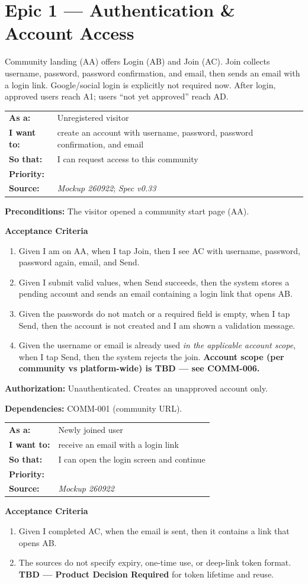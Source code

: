 \documentclass[11pt,a4paper]{article}
\makeatletter
\newcommand{\priPzero}{\colorbox{p0}{\makebox[4.6em]{\textcolor{white}{\scriptsize\bfseries P0 V1}}}}
\newcommand{\srcSpec}{\textit{Spec v0.33}}
\newcommand{\srcMock}{\textit{Mockup 260922}}
\newenvironment{story}[1]{%
  \Needspace{10\baselineskip}%
  \vspace{0.7em}%
  \noindent
  \colorbox{navy}{\makebox[\dimexpr\textwidth-2\fboxsep\relax][l]{\textcolor{white}{\bfseries\ #1}}}%
  \par\vspace{0.35em}%
}{\par\vspace{0.55em}}
\newcommand{\storymeta}[5]{%
  \noindent
  \begin{tabularx}{\textwidth}{@{}>{\bfseries}l X@{}}
    As a: & #1 \\
    I want to: & #2 \\
    So that: & #3 \\
    Priority: & #4 \\
    Source: & #5 \\
  \end{tabularx}
  \par\vspace{0.3em}
}
\newcommand{\achead}{\noindent\textbf{Acceptance Criteria}\par}
\newcommand{\authz}[1]{\noindent\textbf{Authorization:} #1\par}
\newcommand{\deps}[1]{\noindent\textbf{Dependencies:} #1\par}
\newcommand{\precond}[1]{\noindent\textbf{Preconditions:} #1\par}
\makeatother
\begin{document}
\newpage
\section{Epic 1 --- Authentication \& Account Access}
Community landing (AA) offers Login (AB) and Join (AC). Join collects username, password, password confirmation, and email, then sends an email with a login link. Google/social login is explicitly not required now. After login, approved users reach A1; users ``not yet approved'' reach AD.

\begin{story}{AUTH-001 --- Join (create account) from a community URL}
\storymeta{Unregistered visitor}{create an account with username, password, password confirmation, and email}{I can request access to this community}{\priPzero}{\srcMock; \srcSpec}
\precond{The visitor opened a community start page (AA).}
\achead
\begin{enumerate}
  \item Given I am on AA, when I tap Join, then I see AC with username, password, password again, email, and Send.
  \item Given I submit valid values, when Send succeeds, then the system stores a pending account and sends an email containing a login link that opens AB.
  \item Given the passwords do not match or a required field is empty, when I tap Send, then the account is not created and I am shown a validation message.
  \item Given the username or email is already used \emph{in the applicable account scope}, when I tap Send, then the system rejects the join. \textbf{Account scope (per community vs platform-wide) is TBD --- see COMM-006.}
\end{enumerate}
\authz{Unauthenticated. Creates an unapproved account only.}
\deps{COMM-001 (community URL).}
\end{story}

\begin{story}{AUTH-002 --- Email login link after join}
\storymeta{Newly joined user}{receive an email with a login link}{I can open the login screen and continue}{\priPzero}{\srcMock}
\achead
\begin{enumerate}
  \item Given I completed AC, when the email is sent, then it contains a link that opens AB.
  \item The sources do not specify expiry, one-time use, or deep-link token format. \textbf{TBD --- Product Decision Required} for token lifetime and reuse.
\end{enumerate}
\end{story}
\end{document}

